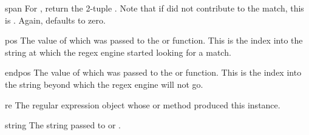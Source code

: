 \begin{funcdesc}{span}{}
For  , return the 2-tuple
.
Note that if  did not contribute to the match, this is
.  Again,  defaults to zero.
\end{funcdesc}

\begin{datadesc}{pos}
The value of  which was passed to the
 or  function.  This is the index into
the string at which the regex engine started looking for a match. 
\end{datadesc}

\begin{datadesc}{endpos}
The value of  which was passed to the
 or  function.  This is the index into
the string beyond which the regex engine will not go.
\end{datadesc}

\begin{datadesc}{re}
The regular expression object whose  or  method
produced this  instance.
\end{datadesc}

\begin{datadesc}{string}
The string passed to  or .
\end{datadesc}

\begin{seealso}
\end{seealso}
